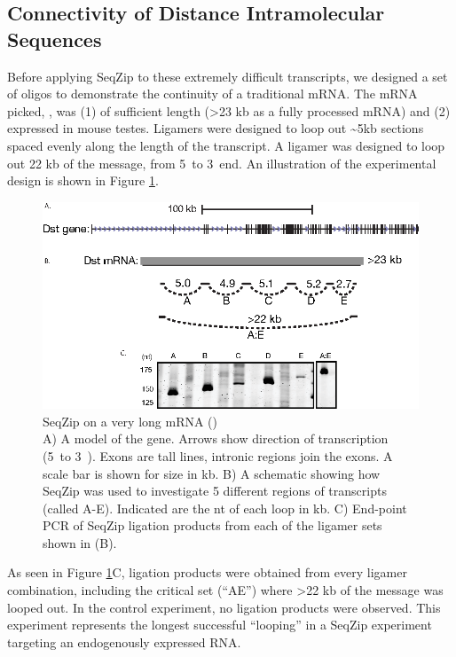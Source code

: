   \subsection{Connectivity of Distance Intramolecular Sequences}
    \label{SeqZipMethod:subsec:SeqZip on long RNAs at multiple locations}

    Before applying SeqZip to these extremely difficult transcripts, we designed a set of oligos to demonstrate the continuity of a traditional mRNA. The mRNA picked, \dst{}, was (1) of sufficient length (>23 kb as a fully processed mRNA) and (2) expressed in mouse testes. Ligamers were designed to loop out \textasciitilde5kb sections spaced evenly along the length of the transcript. A ligamer was designed to loop out 22 kb of the message, from 5\textprime~to 3\textprime~end. An illustration of the experimental design is shown in Figure \ref{SeqZipMethod:fig:SeqZip on dst1}.

    \begin{figure} %
      \centering 
      \includegraphics{Figures/SeqZipMethod/dst1.eps}
      \caption[SeqZip on a very long mRNA (\dst{})]
      {
        SeqZip on a very long mRNA (\dst{})\\[0.25cm]
        A) A model of the \dst{} gene. Arrows show direction of transcription (5\textprime~to 3\textprime~). Exons are tall lines, intronic regions join the exons. A scale bar is shown for size in kb. B) A schematic showing how SeqZip was used to investigate 5 different regions of \dst{} transcripts (called A-E). Indicated are the nt of each loop in kb. C) End-point PCR of SeqZip ligation products from each of the ligamer sets shown in (B).
        }
      \label{SeqZipMethod:fig:SeqZip on dst1}
      \end{figure}

    As seen in Figure \ref{SeqZipMethod:fig:SeqZip on dst1}C, ligation products were obtained from every ligamer combination, including the critical set (``AE'') where >22 kb of the message was looped out. In the control experiment, no ligation products were observed. This experiment represents the longest successful ``looping'' in a SeqZip experiment targeting an endogenously expressed RNA.


